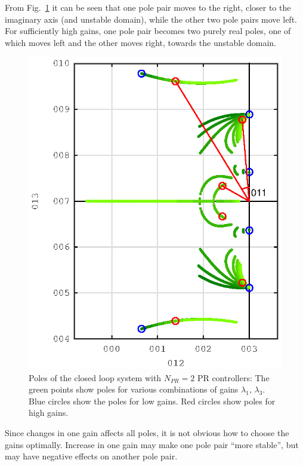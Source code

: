 \documentclass[conference,10pt]{IEEEtran}
\begin{document}
From Fig.~\ref{fig:PoleExample} it can be seen that one pole pair moves to the right, closer to the imaginary axis (and unstable domain), while the other two pole pairs move left. For sufficiently high gains, one pole pair becomes two purely real poles, one of which moves left and the other moves right, towards the unstable domain.
\begin{figure}[!h]
\centering

\includegraphics{fig/root_locus_2D}
\caption{Poles of the closed loop system with $N_{PR}=2$ PR controllers: The green points show poles for various combinations of gains $\lambda_1$,
$\lambda_3$. Blue circles show the poles for low gains. Red circles show poles for high gains. }
\label{fig:PoleExample}
\end{figure}

Since changes in one gain affects all poles, it is not obvious how to choose the gains optimally. Increase in one gain may make one pole pair ``more stable'', but may have negative effects on another pole pair.
\end{document}
